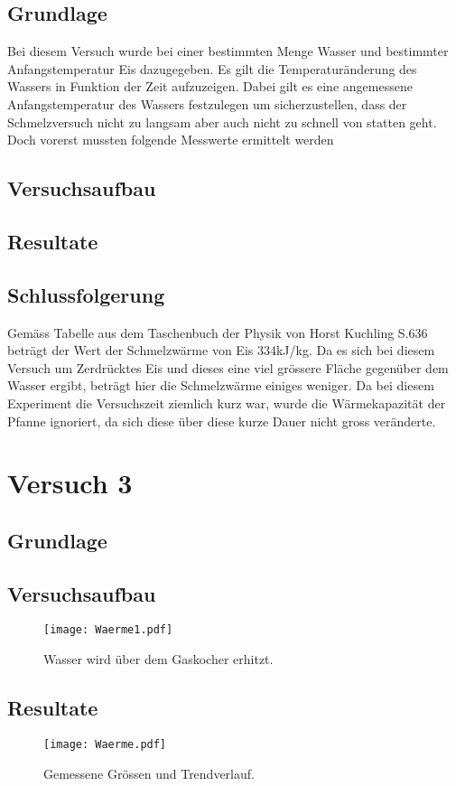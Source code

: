 \documentclass{article}
\begin{document}
\subsection{Grundlage}
Bei diesem Versuch wurde bei einer bestimmten Menge Wasser und bestimmter Anfangstemperatur 
Eis dazugegeben. Es gilt die Temperaturänderung des Wassers in Funktion der Zeit aufzuzeigen. 
Dabei gilt es eine angemessene Anfangstemperatur des Wassers festzulegen um sicherzustellen, dass 
der Schmelzversuch nicht zu langsam aber auch nicht zu schnell von statten geht. Doch vorerst 
mussten folgende Messwerte ermittelt werden
\subsection{Versuchsaufbau}
\subsection{Resultate}
\subsection{Schlussfolgerung}
Gemäss Tabelle aus dem Taschenbuch der Physik von Horst Kuchling S.636 beträgt der Wert der 
Schmelzwärme von Eis 334kJ/kg.  
Da es sich bei diesem Versuch um Zerdrücktes Eis und dieses eine viel grössere Fläche gegenüber 
dem Wasser ergibt, beträgt hier die Schmelzwärme einiges weniger. Da bei diesem Experiment die 
Versuchszeit ziemlich kurz war, wurde die Wärmekapazität der Pfanne ignoriert, da sich diese über 
diese kurze Dauer nicht gross veränderte. 
\section{Versuch 3}
\subsection{Grundlage}
\subsection{Versuchsaufbau}
\begin{figure}[H]
\begin{center}


\texttt{[image: Waerme1.pdf]} 
\caption{Wasser wird über dem Gaskocher erhitzt.}
\end{center}
\end{figure}
\subsection{Resultate}
\begin{figure}[H]
\texttt{[image: Waerme.pdf]} 
\caption{Gemessene Grössen und Trendverlauf.}
\end{figure}
\end{document}
